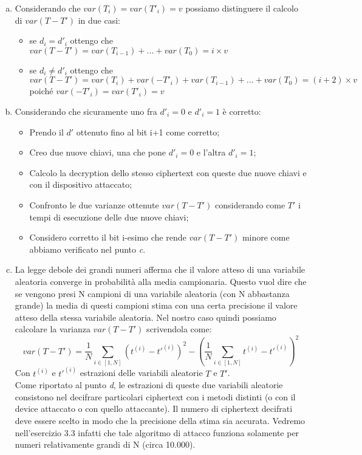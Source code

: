 \documentclass{article}
\begin{document}
\begin{enumerate}[(a)]
    \item Considerando che $var(T_i) = var(T'_i) = v$ possiamo distinguere il calcolo di           $var(T-T')$ in due casi:
        \begin{itemize}
            \item se $d_i = d'_i$ ottengo che $var(T-T') = var(T_{i-1}) + ... + var(T_0) = i \times v$
            \item se $d_i \neq d'_i$ ottengo che $var(T-T') = var(T_i) + var(-T'_i) +var(T_{i-1}) + ... + var(T_0) = (i+2) \times v$ poiché $var(-T'_i)=var(T'_i)=v$
        \end{itemize}
    \item Considerando che sicuramente uno fra $d'_i = 0$ e $d'_i = 1$ è corretto:
        \begin{itemize}
            \item Prendo il $d'$ ottenuto fino al bit i+1 come corretto;
            \item Creo due nuove chiavi, una che pone $d'_i = 0$ e l'altra $d'_i = 1$; 
            \item Calcolo la decryption dello stesso ciphertext con queste due nuove chiavi e con il dispositivo attaccato;
            \item Confronto le due varianze ottenute $var(T-T')$ considerando come $T'$ i tempi di esecuzione delle due nuove chiavi;
            \item Considero corretto il bit i-esimo che rende $var(T-T')$ minore come abbiamo verificato nel punto \textit{c}.
        \end{itemize} 
    \item La legge debole dei grandi numeri afferma che il valore atteso di una variabile          aleatoria converge in probabilità alla media campionaria. Questo vuol dire che se          vengono presi N campioni di una variabile aleatoria (con N abbastanza grande) la media di       questi campioni stima con una certa precisione il valore atteso della stessa variabile     aleatoria. Nel nostro caso quindi possiamo calcolare la varianza $var(T-T')$ scrivendola     come:
        \begin{equation}
            var(T-T') = \dfrac{1}{N}\sum_{i \in [1,N]}{(t^{(i)}-t'^{(i)})^2} - \left(\dfrac{1}{N}\sum_{i \in [1,N]}{t^{(i)}-t'^{(i)}}\right)^2
            \label{eq:variance}
        \end{equation}
        Con $t^{(i)}$ e $t'^{(i)}$ estrazioni delle variabili aleatorie $T$ e $T'$.\\
        Come riportato al punto \textit{d}, le estrazioni di queste due variabili aleatorie consistono nel decifrare particolari ciphertext con i metodi distinti (o con il device attaccato o con quello attaccante). Il numero di ciphertext decifrati deve essere scelto in modo che la precisione della stima sia accurata. Vedremo nell'esercizio 3.3 infatti che tale algoritmo di attacco funziona solamente per numeri relativamente grandi di N (circa 10.000).

\end{enumerate}
\end{document}
